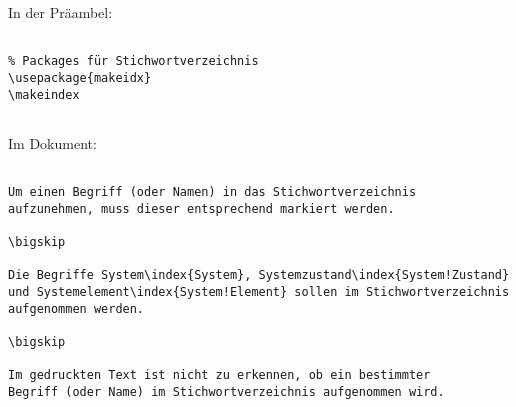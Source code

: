 
In der Präambel:

\begin{verbatim}

% Packages für Stichwortverzeichnis
\usepackage{makeidx}
\makeindex


\end{verbatim}

\tcblower

Im Dokument: 

\begin{verbatim}

Um einen Begriff (oder Namen) in das Stichwortverzeichnis
aufzunehmen, muss dieser entsprechend markiert werden.

\bigskip 

Die Begriffe System\index{System}, Systemzustand\index{System!Zustand} 
und Systemelement\index{System!Element} sollen im Stichwortverzeichnis 
aufgenommen werden. 

\bigskip 

Im gedruckten Text ist nicht zu erkennen, ob ein bestimmter
Begriff (oder Name) im Stichwortverzeichnis aufgenommen wird.

\end{verbatim}
